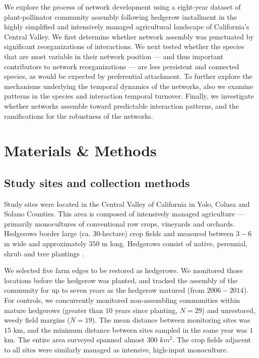 \documentclass[12pt]{article}
\begin{document}
We explore the process of network development using a eight-year
dataset of plant-pollinator community assembly following hedgerow
installment in the highly simplified and intensively managed
agricultural landscape of California's Central Valley. We first
determine whether network assembly was punctuated by significant
reorganizations of interactions. We next tested whether the species
that are most variable in their network position --- and thus
important contributors to network reorganizations --- are less
persistent and connected species, as would be expected by preferential
attachment. To further explore the mechanisms underlying the temporal
dynamics of the networks, also we examine patterns in the species and
interaction temporal turnover. Finally, we investigate whether
networks assemble toward predictable interaction patterns, and the
ramifications for the robustness of the networks.

\section*{Materials \& Methods}
\label{sec:methods}

\subsection*{Study sites and collection methods}
\label{sec:study-sites}

Study sites were located in the Central Valley of California in Yolo,
Colusa and Solano Counties. This area is composed of intensively
managed agriculture --- primarily monocultures of conventional row
crops, vineyards and orchards. Hedgerows border large
(ca. $30$-hectare) crop fields and measured between $3-6$ m wide and
approximately $350$ m long. Hedgerows consist of native, perennial,
shrub and tree plantings \citep[Fig.~S1, ][]{menz-2010-4,
  kremen-2015-602, mgonigle-2015-x}.

We selected five farm edges to be restored as hedgerows. We monitored
those locations before the hedgerow was planted, and tracked the
assembly of the community for up to seven years as the hedgerow
matured (from $2006-2014$). For controls, we concurrently monitored
non-assembling communities within mature hedgerows (greater than $10$
years since planting, $N=29$) and unrestored, weedy field margins
($N=19$). The mean distance between monitoring sites was $15$ km, and
the minimum distance between sites sampled in the same year was $1$
km. The entire area surveyed spanned almost $300$ $km^2$. The crop
fields adjacent to all sites were similarly managed as intensive,
high-input monoculture.
\end{document}
